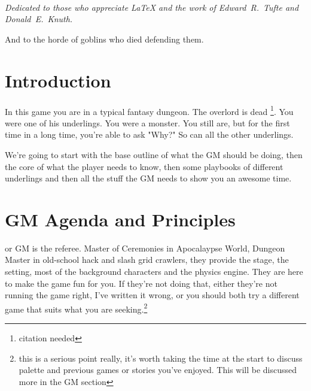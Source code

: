 \documentclass{tufte-book}
\begin{document}
\tableofcontents

\listoffigures

\listoftables

\cleardoublepage
~\vfill
\begin{doublespace}
\noindent\fontsize{18}{22}\selectfont\itshape
\nohyphenation
Dedicated to those who appreciate \LaTeX{} 
and the work of \mbox{Edward R.~Tufte} 
and \mbox{Donald E.~Knuth}.

And to the horde of goblins who died defending them.
\end{doublespace}
\vfill
\vfill


\cleardoublepage
\chapter*{Introduction}


In this game you are in a typical fantasy dungeon. The overlord is dead \footnote {citation needed}. You were one of his underlings. You were a monster. You still are, but for the first time in a long time, you're able to ask "Why?" So can all the other underlings.

We're going to start with the base outline of what the GM should be doing, then the core of what the player needs to know, then some playbooks of different underlings and then all the stuff the GM needs to show you an awesome time.

\mainmatter


\chapter{GM Agenda and Principles}
\label{ch:agenda}


 or GM is the referee. Master of Ceremonies in Apocalaypse World, Dungeon Master in old-school hack and slash grid crawlers, they provide the stage, the setting, most of the background characters and the physics engine. They are here to make the game fun for you. If they're not doing that, either they're not running the game right, I've written it wrong, or you should both try a different game that suits what you are seeking.\footnote{this is a serious point really, it's worth taking the time at the start to  discuss palette and previous games or stories you've enjoyed. This will be discussed more in the GM section}


\bigskip
\end{document}
